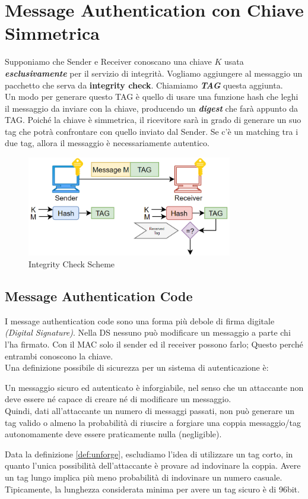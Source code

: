 \section{Message Authentication con Chiave Simmetrica}
Supponiamo che Sender e Receiver conoscano una chiave $K$ usata \textbf{\textit{esclusivamente}} per il servizio di integrità. Vogliamo aggiungere al messaggio un pacchetto che serva da \textbf{integrity check}. Chiamiamo \textbf{\textit{TAG}} questa aggiunta.\\
Un modo per generare questo TAG è quello di usare una funzione hash che leghi il messaggio da inviare con la chiave, producendo un \textbf{\textit{digest}} che farà appunto da TAG. Poiché la chiave è simmetrica, il ricevitore sarà in grado di generare un suo tag che potrà confrontare con quello inviato dal Sender. Se c'è un matching tra i due tag, allora il messaggio è necessariamente autentico. 
\begin{figure}[h]
    \centering
    \includegraphics[width=0.8\textwidth]{image/integrityscheme.png}
    \caption{Integrity Check Scheme}
    \label{fig:intcheck}
\end{figure}
\subsection{Message Authentication Code}
I message authentication code sono una forma più debole di firma digitale \textit{(Digital Signature)}. Nella DS nessuno può modificare un messaggio a parte chi l'ha firmato. Con il MAC solo il sender ed il receiver possono farlo; Questo perché entrambi conoscono la chiave.\\
Una definizione possibile di sicurezza per un sistema di autenticazione è:
\begin{definition}[Unforgeability]\label{def:unforge}
Un messaggio sicuro ed autenticato è inforgiabile, nel senso che un attaccante non deve essere né capace di creare né di modificare un messaggio.\\
Quindi, dati all'attaccante un numero di messaggi passati, non può generare un tag valido o almeno la probabilità di riuscire a forgiare una coppia messaggio/tag autonomamente deve essere praticamente nulla (negligible). 
\end{definition}
\begin{remark}
Data la definizione \ref{def:unforge}, escludiamo l'idea di utilizzare un tag corto, in quanto l'unica possibilità dell'attaccante è provare ad indovinare la coppia. Avere un tag lungo implica più meno probabilità di indovinare un numero casuale.\\
Tipicamente, la lunghezza considerata minima per avere un tag sicuro è di 96bit.
\end{remark}
